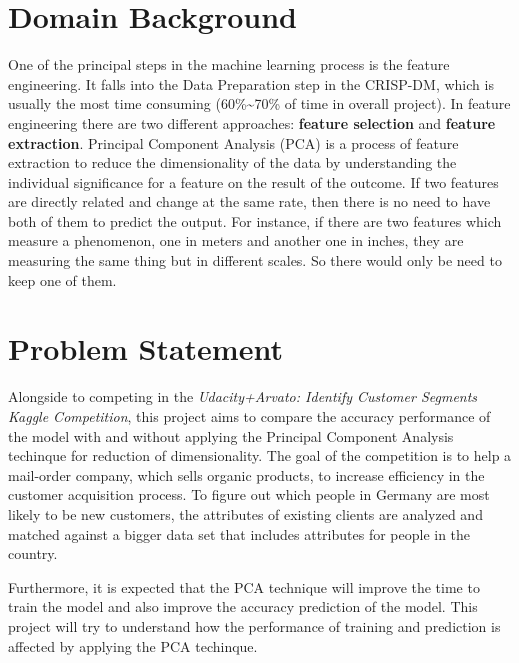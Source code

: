 \hypertarget{domain-background}{%
\section{Domain Background}\label{domain-background}}

One of the principal steps in the machine learning process is the
feature engineering\cite{sarkar2017practical}. It falls into the Data
Preparation step in the CRISP-DM, which is usually the most time
consuming (60\%\textasciitilde70\% of time in overall
project)\cite{sarkar2017practical}. In feature engineering there are two
different approaches: \textbf{feature selection} and \textbf{feature
extraction}\cite{sarkar2017practical}. Principal Component Analysis
(PCA) is a process of feature extraction\cite{sarkar2017practical} to
reduce the dimensionality of the data by understanding the individual
significance for a feature on the result of the
outcome\cite{shlens2014tutorial}. If two features are directly related
and change at the same rate, then there is no need to have both of them
to predict the output. For instance, if there are two features which
measure a phenomenon, one in meters and another one in inches, they are
measuring the same thing but in different scales. So there would only be
need to keep one of them.

\hypertarget{problem-statement}{%
\section{Problem Statement}\label{problem-statement}}

Alongside to competing in the \emph{Udacity+Arvato: Identify Customer
Segments Kaggle Competition}\cite{arvato_kaggle_competition}, this
project aims to compare the accuracy performance of the model with and
without applying the Principal Component Analysis techinque for
reduction of dimensionality. The goal of the competition is to help a
mail-order company, which sells organic products, to increase efficiency
in the customer acquisition process. To figure out which people in
Germany are most likely to be new customers, the attributes of existing
clients are analyzed and matched against a bigger data set that includes
attributes for people in the country.

Furthermore, it is expected that the PCA technique will improve the time
to train the model and also improve the accuracy prediction of the
model. This project will try to understand how the performance of
training and prediction is affected by applying the PCA techinque.


